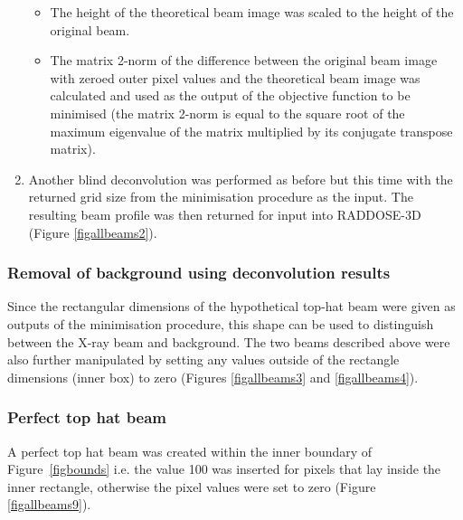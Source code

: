\begin{enumerate}
\begin{itemize}
\item The height of the theoretical beam image was scaled to the height of the original beam.
\item The matrix 2-norm of the difference between the original beam image with zeroed outer pixel values and the theoretical beam image was calculated and used as the output of the objective function to be minimised (the matrix 2-norm is equal to the square root of the maximum eigenvalue of the matrix multiplied by its conjugate transpose matrix).
\end{itemize}
\item Another blind deconvolution was performed as before but this time with the returned grid size from the minimisation procedure as the input.
The resulting beam profile was then returned for input into RADDOSE-3D (Figure \ref{figallbeams2}).
\end{enumerate}

\subsubsection{Removal of background using deconvolution results}
Since the rectangular dimensions of the hypothetical top-hat beam were given as outputs of the minimisation procedure, this shape can be used to distinguish between the X-ray beam and background.
The two beams described above were also further manipulated by setting any values outside of the rectangle dimensions (inner box) to zero (Figures \ref{figallbeams3} and \ref{figallbeams4}).

\subsubsection{Perfect top hat beam}
A perfect top hat beam was created within the inner boundary of Figure~\ref{figbounds}  i.e. the value 100 was inserted for pixels that lay inside the inner rectangle, otherwise the pixel values were set to zero (Figure \ref{figallbeams9}).

